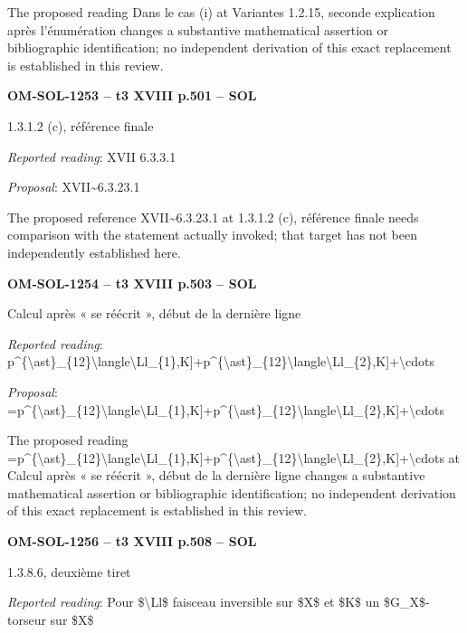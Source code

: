 The proposed reading Dans le cas (i) at Variantes 1.2.15, seconde explication après l'énumération changes a substantive mathematical assertion or bibliographic identification; no independent derivation of this exact replacement is established in this review.\par
\par\noindent\textbf{OM-SOL-1253 -- t3 XVIII p.501 -- SOL}\par
1.3.1.2 (c), référence finale\par
\emph{Reported reading}: XVII 6.3.3.1\par
\emph{Proposal}: XVII\textasciitilde{}6.3.23.1\par
The proposed reference XVII\textasciitilde{}6.3.23.1 at 1.3.1.2 (c), référence finale needs comparison with the statement actually invoked; that target has not been independently established here.\par
\par\noindent\textbf{OM-SOL-1254 -- t3 XVIII p.503 -- SOL}\par
Calcul après « se réécrit », début de la dernière ligne\par
\emph{Reported reading}: p\textasciicircum{}\{\textbackslash{}ast\}\_\{12\}\textbackslash{}langle\textbackslash{}Ll\_\{1\},K]+p\textasciicircum{}\{\textbackslash{}ast\}\_\{12\}\textbackslash{}langle\textbackslash{}Ll\_\{2\},K]+\textbackslash{}cdots\par
\emph{Proposal}: =\allowbreak p\textasciicircum{}\{\textbackslash{}ast\}\_\{12\}\textbackslash{}langle\textbackslash{}Ll\_\{1\},K]+p\textasciicircum{}\{\textbackslash{}ast\}\_\{12\}\textbackslash{}langle\textbackslash{}Ll\_\{2\},K]+\textbackslash{}cdots\par
The proposed reading =\allowbreak p\textasciicircum{}\{\textbackslash{}ast\}\_\{12\}\textbackslash{}langle\textbackslash{}Ll\_\{1\},K]+p\textasciicircum{}\{\textbackslash{}ast\}\_\{12\}\textbackslash{}langle\textbackslash{}Ll\_\{2\},K]+\textbackslash{}cdots at Calcul après « se réécrit », début de la dernière ligne changes a substantive mathematical assertion or bibliographic identification; no independent derivation of this exact replacement is established in this review.\par
\par\noindent\textbf{OM-SOL-1256 -- t3 XVIII p.508 -- SOL}\par
1.3.8.6, deuxième tiret\par
\emph{Reported reading}: Pour \$\textbackslash{}Ll\$ faisceau inversible sur \$X\$ et \$K\$ un \$G\_X\$-torseur sur \$X\$\par
